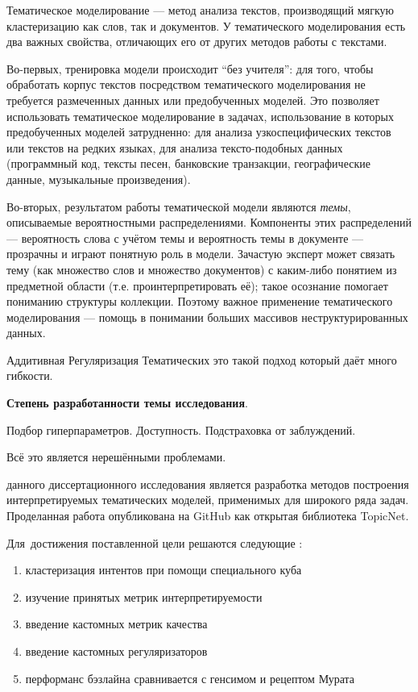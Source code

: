 
{\actuality} Тематическое моделирование --- метод анализа текстов, производящий мягкую кластеризацию как слов, так и документов. У тематического моделирования есть два важных свойства, отличающих его от других методов работы с текстами. 

Во-первых, тренировка модели происходит ``без учителя'': для того, чтобы обработать корпус текстов посредством тематического моделирования не требуется размеченных данных или предобученных моделей. Это позволяет использовать тематическое моделирование в задачах, использование в которых предобученных моделей затрудненно: для анализа узкоспецифических текстов или текстов на редких языках, для анализа тексто-подобных данных (программный код, тексты песен, банковские транзакции, географические данные, музыкальные произведения).

Во-вторых, результатом работы тематической модели являются \textit{темы}, описываемые вероятностными распределениями. Компоненты этих распределений --- вероятность слова с учётом темы и вероятность темы в документе --- прозрачны и играют понятную роль в модели. 
Зачастую эксперт может связать тему (как множество слов и множество документов) с каким-либо понятием из предметной области (т.е. проинтерпретировать её); такое осознание помогает пониманию структуры коллекции. Поэтому важное применение тематического моделирования --- помощь в понимании больших массивов неструктурированных данных.

Аддитивная Регуляризация Тематических это такой подход который даёт много гибкости.

\textbf{Степень разработанности темы исследования}. 

Подбор гиперпараметров. Доступность. Подстраховка от заблуждений.

Всё это является нерешёнными проблемами.


{\aim} данного диссертационного исследования является разработка методов построения интерпретируемых тематических моделей, применимых для широкого ряда задач. Проделанная работа опубликована на GitHub как открытая библиотека TopicNet.

Для~достижения поставленной цели решаются следующие {\tasks}:
\begin{enumerate}[beginpenalty=10000] %
  \item кластеризация интентов при помощи специального куба
  \item изучение принятых метрик интерпретируемости
  \item введение кастомных метрик качества
  \item введение кастомных регуляризаторов
  \item перформанс бэзлайна сравнивается с генсимом и рецептом Мурата
\end{enumerate}

